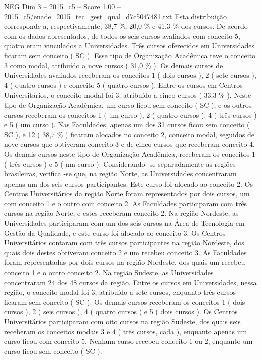 \begin{textsample}{NEG Dim 3 – 2015\_c5 – Score 1.00 – 2015\_c5/enade\_2015\_tec\_gest\_qual\_d7c5047481.txt}
Esta distribuição corresponde a, respectivamente, 38,7 \%, 20,0 \% e 41,3 \% dos cursos.
De acordo com os dados apresentados, de todos os seis cursos avaliados com conceito 5, quatro eram vinculados a Universidades.
Três cursos oferecidos em Universidades ficaram sem conceito ( SC ).
Esse tipo de Organização Acadêmica teve o conceito 3 como modal, atribuído a nove cursos ( 31,0 \% ).
Os demais cursos de Universidades avaliados receberam os conceitos 1 ( dois cursos ), 2 ( sete cursos ), 4 ( quatro cursos ) e conceito 5 ( quatro cursos ).
Entre os cursos em Centros Universitários, o conceito modal foi 3, atribuído a cinco cursos ( 33,3 \% ).
Neste tipo de Organização Acadêmica, um curso ficou sem conceito ( SC ), e os outros cursos receberam os conceitos 1 ( um curso ), 2 ( quatro cursos ), 4 ( três cursos ) e 5 ( um curso ).
Nas Faculdades, apenas um dos 31 cursos ficou sem conceito ( SC ), e 12 ( 38,7 \% ) ficaram alocados no conceito 2, conceito modal, seguidos de nove cursos que obtiveram conceito 3 e de cinco cursos que receberam conceito 4.
Os demais cursos neste tipo de Organização Acadêmica, receberam os conceitos 1 ( três cursos ) e 5 ( um curso ).
Considerando -se separadamente as regiões brasileiras, verifica -se que, na região Norte, as Universidades concentraram apenas um dos seis cursos participantes.
Este curso foi alocado ao conceito 2.
Os Centros Universitários da região Norte foram representados por dois cursos, um com conceito 1 e o outro com conceito 2.
As Faculdades participaram com três cursos na região Norte, e estes receberam conceito 2.
Na região Nordeste, as Universidades participaram com um dos seis cursos na Área de Tecnologia em Gestão da Qualidade, e este curso foi alocado ao conceito 3.
Os Centros Universitários contaram com três cursos participantes na região Nordeste, dos quais dois destes obtiveram conceito 2 e um recebeu conceito 3.
As Faculdades foram representadas por dois cursos na região Nordeste, dos quais um recebeu conceito 1 e o outro conceito 2.
Na região Sudeste, as Universidades concentraram 24 dos 48 cursos da região.
Entre os cursos em Universidades, nessa região, o conceito modal foi 3, atribuído a sete cursos, enquanto três cursos ficaram sem conceito ( SC ).
Os demais cursos receberam os conceitos 1 ( dois cursos ), 2 ( seis cursos ), 4 ( quatro cursos ) e 5 ( dois cursos ).
Os Centros Universitários participaram com oito cursos na região Sudeste, dos quais seis receberam os conceitos modais 3 e 4 ( três cursos, cada ), enquanto apenas um curso ficou com conceito 5.
Nenhum curso recebeu conceito 1 ou 2, enquanto um curso ficou sem conceito ( SC ).

\end{textsample}
